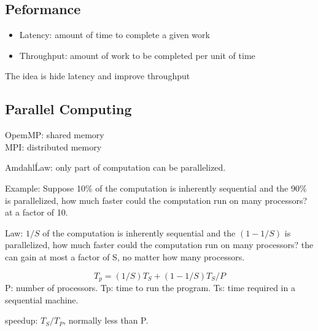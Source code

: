 \subsection{Peformance}
\begin{itemize}
  \item Latency: amount of time to complete a given work
  \item Throughput: amount of work to be completed per unit of time
\end{itemize}

The idea is hide latency and improve throughput

\subsection{Parallel Computing}
OpemMP: shared memory \\
MPI: distributed memory 

Amdahl\' Law: only part of computation can be parallelized.

Example: Suppose 10\% of the computation is inherently sequential and the 90\% is parallelized, how much faster could the computation run on many processors? at a factor of 10.

Law: $1/S$ of the computation is inherently sequential and the $(1-1/S)$ is parallelized, how much faster could the computation run on many processors? the can gain at most a factor of S, no matter how many processors.

\begin{equation}
T_p = (1/S)T_S + (1-1/S)T_S/P 
\end{equation}
P: number of processors. Tp: time to run the program. Ts: time required in a sequential machine.

speedup: $T_S/T_P$, normally less than P.
